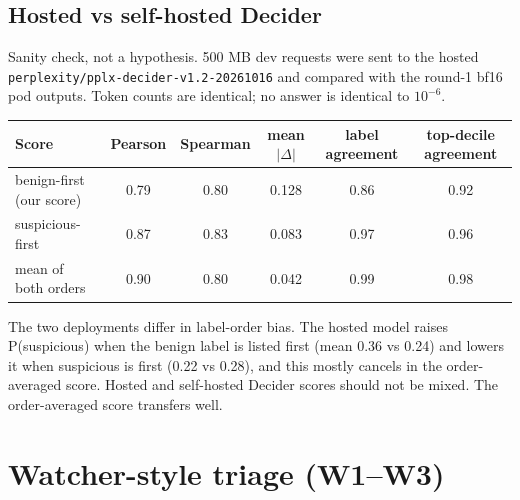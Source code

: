 \documentclass[11pt]{article}
\begin{document}
\subsection{Hosted vs self-hosted Decider}
Sanity check, not a hypothesis. 500 MB dev requests were sent to the hosted \texttt{perplexity/pplx-decider-v1.2-20261016} and compared with the round-1 bf16 pod outputs. Token counts are identical; no answer is identical to $10^{-6}$.
\begin{center}\small
\begin{tabular}{@{}lccccc@{}}
\toprule
Score & Pearson & Spearman & mean $|\Delta|$ & label agreement & top-decile agreement\\
\midrule
benign-first (our score) & 0.79 & 0.80 & 0.128 & 0.86 & 0.92\\
suspicious-first & 0.87 & 0.83 & 0.083 & 0.97 & 0.96\\
mean of both orders & 0.90 & 0.80 & 0.042 & 0.99 & 0.98\\
\bottomrule
\end{tabular}
\end{center}
The two deployments differ in label-order bias. The hosted model raises P(suspicious) when the benign label is listed first (mean 0.36 vs 0.24) and lowers it when suspicious is first (0.22 vs 0.28), and this mostly cancels in the order-averaged score. Hosted and self-hosted Decider scores should not be mixed. The order-averaged score transfers well.

\section{Watcher-style triage (W1--W3)}\label{sec:watch}
\end{document}
